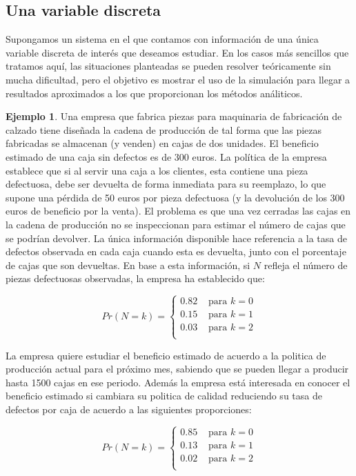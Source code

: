 \documentclass[
]{book}
\theoremstyle{definition}
\theoremstyle{definition}
\newtheorem{example}{Ejemplo}[chapter]
\theoremstyle{definition}
\theoremstyle{definition}
\theoremstyle{remark}
\begin{document}
\hypertarget{una-variable-discreta}{%
\subsection{Una variable discreta}\label{una-variable-discreta}}

Supongamos un sistema en el que contamos con información de una única variable discreta de interés que deseamos estudiar. En los casos más sencillos que tratamos aquí, las situaciones planteadas se pueden resolver teóricamente sin mucha dificultad, pero el objetivo es mostrar el uso de la simulación para llegar a resultados aproximados a los que proporcionan los métodos análiticos.

\begin{example}
\protect\hypertarget{exm:discreta1}{}\label{exm:discreta1}Una empresa que fabrica piezas para maquinaria de fabricación de calzado tiene diseñada la cadena de producción de tal forma que las piezas fabricadas se almacenan (y venden) en cajas de dos unidades. El beneficio estimado de una caja sin defectos es de 300 euros. La política de la empresa establece que si al servir una caja a los clientes, esta contiene una pieza defectuosa, debe ser devuelta de forma inmediata para su reemplazo, lo que supone una pérdida de 50 euros por pieza defectuosa (y la devolución de los 300 euros de beneficio por la venta). El problema es que una vez cerradas las cajas en la cadena de producción no se inspeccionan para estimar el número de cajas que se podrían devolver. La única información disponible hace referencia a la tasa de defectos observada en cada caja cuando esta es devuelta, junto con el porcentaje de cajas que son devueltas. En base a esta información, si \(N\) refleja el número de piezas defectuosas observadas, la empresa ha establecido que:

\begin{equation}
Pr(N = k) = 
\begin{cases}
0.82 & \text{ para } k = 0\\
0.15 & \text{ para } k = 1\\
0.03 & \text{ para } k = 2\\
\end{cases}
\label{eq:var-discreta1}
\end{equation}

La empresa quiere estudiar el beneficio estimado de acuerdo a la politica de producción actual para el próximo mes, sabiendo que se pueden llegar a producir hasta 1500 cajas en ese periodo. Además la empresa está interesada en conocer el beneficio estimado si cambiara su politica de calidad reduciendo su tasa de defectos por caja de acuerdo a las siguientes proporciones:

\begin{equation}
Pr(N = k) = 
\begin{cases}
0.85 & \text{ para } k = 0\\
0.13 & \text{ para } k = 1\\
0.02 & \text{ para } k = 2\\
\end{cases}
\label{eq:var-discreta1-1}
\end{equation}
\end{example}
\end{document}
